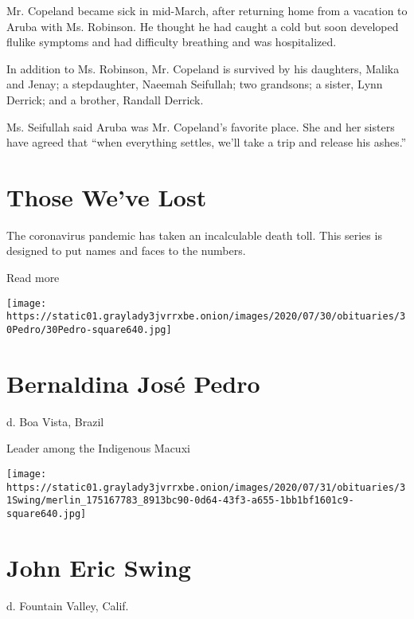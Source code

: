 Mr. Copeland became sick in mid-March, after returning home from a
vacation to Aruba with Ms. Robinson. He thought he had caught a cold but
soon developed flulike symptoms and had difficulty breathing and was
hospitalized.

In addition to Ms. Robinson, Mr. Copeland is survived by his daughters,
Malika and Jenay; a stepdaughter, Naeemah Seifullah; two grandsons; a
sister, Lynn Derrick; and a brother, Randall Derrick.

Ms. Seifullah said Aruba was Mr. Copeland's favorite place. She and her
sisters have agreed that ``when everything settles, we'll take a trip
and release his ashes.''

\href{https://www.nytimes3xbfgragh.onion/interactive/2020/obituaries/people-died-coronavirus-obituaries.html?action=click\&pgtype=Article\&state=default\&region=BELOW_MAIN_CONTENT\&context=covid_obits_promo}{}

\hypertarget{those-weve-lost}{%
\section{Those We've Lost}\label{those-weve-lost}}

The coronavirus pandemic has taken an incalculable death toll. This
series is designed to put names and faces to the numbers.

Read more

\texttt{[image: https://static01.graylady3jvrrxbe.onion/images/2020/07/30/obituaries/30Pedro/30Pedro-square640.jpg]}

\hypertarget{bernaldina-josuxe9-pedro}{%
\section{Bernaldina José Pedro}\label{bernaldina-josuxe9-pedro}}

d. Boa Vista, Brazil

Leader among the Indigenous Macuxi

\texttt{[image: https://static01.graylady3jvrrxbe.onion/images/2020/07/31/obituaries/31Swing/merlin\_175167783\_8913bc90-0d64-43f3-a655-1bb1bf1601c9-square640.jpg]}

\hypertarget{john-eric-swing}{%
\section{John Eric Swing}\label{john-eric-swing}}

d. Fountain Valley, Calif.

